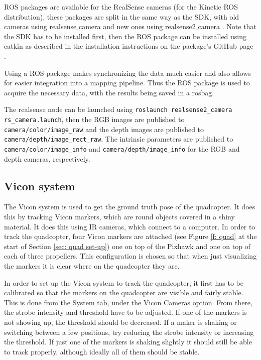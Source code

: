 \documentclass[12pt,a4paper]{article}
\newcommand{\code}[1]{\lstinline{#1}}
\begin{document}
    ROS packages are available for the RealSense cameras (for the Kinetic ROS distribution), these packages are split in the same way as the SDK, with old cameras using realsense$\_$camera \cite{realsense-camera} and new ones using realsense2$\_$camera \cite{realsense2-camera}. Note that the SDK has to be installed first, then the ROS package can be installed using catkin as described in the installation instructions on the package's GitHub page \cite{realsense2-camera-git}.
     
    Using a ROS package makes synchronizing the data much easier and also allows for easier integration into a mapping pipeline. Thus the ROS package is used to acquire the necessary data, with the results being saved in a rosbag. 
     
    The realsense node can be launched using \code{roslaunch realsense2_camera rs_camera.launch}, then the RGB images are published to \code{camera/color/image_raw} and the depth images are published to \code{camera/depth/image_rect_raw}. The intrinsic parameters are published to \code{camera/color/image_info} and \code{camera/depth/image_info} for the RGB and depth cameras, respectively.


  \subsection{Vicon system}
    \label{ssec: BI vicon}
    The Vicon system is used to get the ground truth pose of the quadcopter. It does this by tracking Vicon markers, which are round objects covered in a shiny material. It does this using IR cameras, which connect to a computer. In order to track the quadcopter, four Vicon markers are attached (see Figure \ref{f: quad} at the start of Section \ref{sec: quad set-up}) one on top of the Pixhawk and one on top of each of three propellers. This configuration is chosen so that when just visualizing the markers it is clear where on the quadcopter they are.
     
    In order to set up the Vicon system to track the quadcopter, it first has to be calibrated so that the markers on the quadcopter are visible and fairly stable. This is done from the System tab, under the Vicon Cameras option. From there, the strobe intensity and threshold have to be adjusted. If one of the markers is not showing up, the threshold should be decreased. If a maker is shaking or switching between a few positions, try reducing the strobe intensity or increasing the threshold. If just one of the markers is shaking slightly it should still be able to track properly, although ideally all of them should be stable.
     
\end{document}
